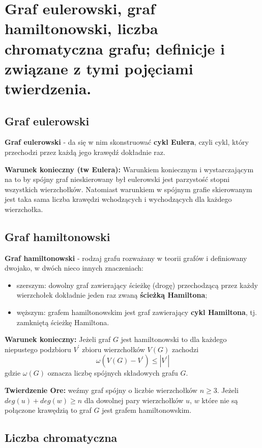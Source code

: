 \section{Graf eulerowski, graf hamiltonowski,
    liczba chromatyczna grafu; definicje i związane z tymi pojęciami twierdzenia.}

\subsection{Graf eulerowski}
\textbf{Graf eulerowski} - da się w nim skonstruować \textbf{cykl Eulera}, czyli cykl,
który przechodzi przez każdą jego krawędź dokładnie raz.

\textbf{Warunek konieczny (tw Eulera):}
Warunkiem koniecznym i wystarczającym na to by spójny graf nieskierowany
był eulerowski jest parzystość stopni wszystkich wierzchołków.
Natomiast warunkiem w spójnym grafie skierowanym
jest taka sama liczba krawędzi wchodzących i wychodzących dla każdego wierzchołka.

\subsection{Graf hamiltonowski}
\textbf{Graf hamiltonowski} - rodzaj grafu rozważany w teorii grafów i definiowany dwojako, w dwóch nieco innych znaczeniach:
\begin{itemize}[itemsep=0pt,partopsep=0pt, parsep=0pt]
    \item szerszym: dowolny graf zawierający ścieżkę (drogę) przechodzącą przez
    każdy wierzchołek dokładnie jeden raz zwaną \textbf{ścieżką Hamiltona};
    \item węższym: grafem hamiltonowskim jest graf zawierający \textbf{cykl Hamiltona}, tj. zamkniętą ścieżkę Hamiltona.
\end{itemize}

\textbf{Warunek konieczny:} Jeżeli graf $G$ jest hamiltonowski
to dla każdego niepustego podzbioru $V^{\prime}$ zbioru wierzchołków $V(G)$ zachodzi
\[
    \omega(V(G) - V^{\prime}) \leqslant \left| V^{\prime} \right|
\]
gdzie $\omega (G)$ oznacza liczbę spójnych składowych grafu $G$.


\textbf{Twierdzenie Ore:} weźmy graf spójny o liczbie wierzchołków $n \geq 3$.
Jeżeli $deg(u)+deg(w)\geq n$ dla dowolnej pary wierzchołków $u$, $w$
które nie są połączone krawędzią to graf $G$ jest grafem hamiltonowskim.

\subsection{Liczba chromatyczna}

